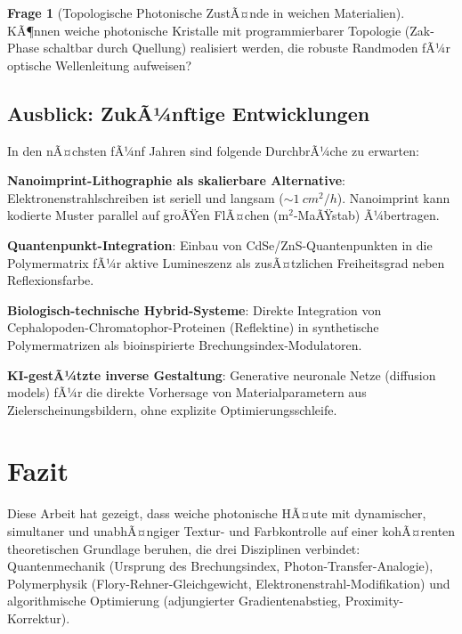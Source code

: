 ﻿\documentclass[a4paper,12pt]{article}
\theoremstyle{definition}
\newtheorem{frage}{Frage}[section]
\begin{document}
	\begin{frage}[Topologische Photonische ZustÃ¤nde in weichen Materialien]
		KÃ¶nnen weiche photonische Kristalle mit programmierbarer
		Topologie (Zak-Phase schaltbar durch Quellung) realisiert werden,
		die robuste Randmoden fÃ¼r optische Wellenleitung aufweisen?
	\end{frage}
	
	\subsection{Ausblick: ZukÃ¼nftige Entwicklungen}
	
	In den nÃ¤chsten fÃ¼nf Jahren sind folgende DurchbrÃ¼che zu erwarten:
	
	\textbf{Nanoimprint-Lithographie als skalierbare Alternative}:
	Elektronenstrahlschreiben ist seriell und langsam ($\sim \SI{1}{cm^2/h}$).
	Nanoimprint kann kodierte Muster parallel auf groÃŸen FlÃ¤chen
	($\mathrm{m}^2$-MaÃŸstab) Ã¼bertragen.
	
	\textbf{Quantenpunkt-Integration}:
	Einbau von CdSe/ZnS-Quantenpunkten in die Polymermatrix fÃ¼r
	aktive Lumineszenz als zusÃ¤tzlichen Freiheitsgrad neben Reflexionsfarbe.
	
	\textbf{Biologisch-technische Hybrid-Systeme}:
	Direkte Integration von Cephalopoden-Chromatophor-Proteinen
	(Reflektine) in synthetische Polymermatrizen als bioinspirierte
	Brechungsindex-Modulatoren.
	
	\textbf{KI-gestÃ¼tzte inverse Gestaltung}:
	Generative neuronale Netze (diffusion models) fÃ¼r die direkte
	Vorhersage von Materialparametern aus Zielerscheinungsbildern,
	ohne explizite Optimierungsschleife.
	
	\section{Fazit}
	\label{sec:fazit}
	
	Diese Arbeit hat gezeigt, dass weiche photonische HÃ¤ute mit dynamischer,
	simultaner und unabhÃ¤ngiger Textur- und Farbkontrolle auf einer kohÃ¤renten
	theoretischen Grundlage beruhen, die drei Disziplinen verbindet:
	Quantenmechanik (Ursprung des Brechungsindex, Photon-Transfer-Analogie),
	Polymerphysik (Flory-Rehner-Gleichgewicht, Elektronenstrahl-Modifikation)
	und algorithmische Optimierung (adjungierter Gradientenabstieg,
	Proximity-Korrektur).
	
\end{document}

